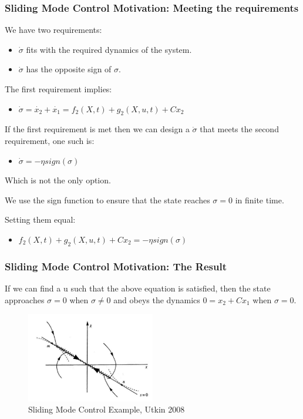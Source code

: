 \documentclass[aspectratio=169]{beamer}
\begin{document}
\begin{frame}
    \frametitle{Sliding Mode Control Motivation: Meeting the requirements}
    We have two requirements:
    \begin{itemize}
        \item $\dot{\sigma}$ fits with the required dynamics of the system.
        \item $\dot{\sigma}$ has the opposite sign of $\sigma$.
    \end{itemize}
    
    The first requirement implies:
    \begin{itemize}
        \item $\dot{\sigma}=\dot{x_2}+\dot{x_1}=f_2(X,t)+g_2(X,u,t)+Cx_2$
    \end{itemize}
    
    If the first requirement is met then we can design a $\dot{\sigma}$ that meets the second requirement, one such is:
    \begin{itemize}
        \item $\dot{\sigma}=-\eta sign(\sigma)$
    \end{itemize}
    Which is not the only option. 
    
    We use the sign function to ensure that the state reaches $\sigma=0$ in finite time.
    
    Setting them equal:
    \begin{itemize}
        \item $f_2(X,t)+g_2(X,u,t)+Cx_2=-\eta sign(\sigma)$
    \end{itemize}
    
    
\end{frame}
\begin{frame}
    \frametitle{Sliding Mode Control Motivation: The Result}
    If we can find a u such that the above equation is satisfied, then the state approaches $\sigma=0$ when $\sigma\ne0$ and obeys the dynamics $0=x_2+Cx_1$ when $\sigma=0$.
    \begin{figure}[htbp]
        \centering
        \includegraphics[width=0.5\textwidth]{Sliding Mode Figure.png}
        \caption{Sliding Mode Control Example, Utkin 2008 \cite{UtkinSMC}}
    \end{figure}
    

\end{frame}
\end{document}
